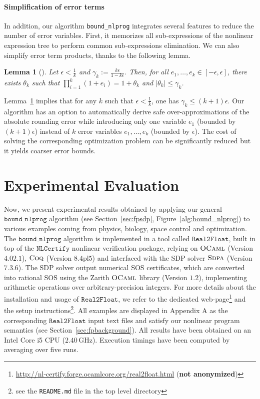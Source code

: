 \documentclass[preprint,fleqn,nocopyrightspace]{sigplanconf}
\newcommand{\code}[1]{\lstinline{#1}}
\newcommand{\boundnlprog}{\mathtt{bound\_nlprog}}
\newcommand{\realtofloat}{\mathtt{Real2Float}}
\newcommand{\coq}{\text{\sc Coq}}
\newcommand{\ocaml}{\text{\sc OCaml}}
\newcommand{\sdpa}{\text{\sc Sdpa}}
\newcommand{\nlcertify}{\mathtt{NLCertify}}
\newtheorem{lemma}[theorem]{Lemma}
\theoremstyle{plain}
\begin{document}
\paragraph{Simplification of error terms}
%
In addition, our algorithm \code{bound_nlprog} integrates several features to reduce the number of error variables. First, it memorizes all sub-expressions of the nonlinear expression tree to perform common sub-expressions elimination. 
We can also simplify error term products, thanks to the following lemma.
\begin{lemma}[]
\label{th:redproduct}
Let $\epsilon < \frac{1}{k}$ and $\gamma_k := \frac{k \epsilon}{1 - k \epsilon}$. Then, for all $e_1, \dots, e_k \in [-\epsilon, \epsilon]$, there exists $\theta_k$ such that ${\prod_{i=1}^k (1 + e_i) = 1 + \theta_k}$ and $\mid \theta_k \mid \leq \gamma_k$.
\end{lemma}
%
Lemma~\ref{th:redproduct} implies that for any $k$ such that $\epsilon < \frac{1}{k}$, one has $\gamma_k \leq (k + 1) \epsilon$. Our algorithm has an option to automatically derive safe over-approximations of the absolute rounding error while introducing only one variable $e_1$ (bounded by $(k + 1) \epsilon$) instead of $k$ error variables $e_1, \dots, e_k$ (bounded by $\epsilon$). The cost of solving the corresponding optimization problem can be significantly reduced but it yields coarser error bounds.
%
\vspace*{-0.2cm}
\section{Experimental Evaluation}
\label{sec:benchs}
%
Now, we present experimental results obtained by applying our general $\boundnlprog$ algorithm (see Section~\ref{sec:fpsdp}, Figure~\ref{alg:bound_nlprog}) to various examples coming from physics, biology, space control and optimization. 
The  $\boundnlprog$ algorithm is implemented in a tool called $\realtofloat$, built in top of the $\nlcertify$ nonlinear verification package, relying on $\ocaml$ (Version $4.02.1$), $\coq$ (Version $8.4\text{pl}5$) and interfaced with the SDP solver $\sdpa$ (Version $7.3.6$). The SDP solver output numerical SOS certificates, which are converted into rational SOS using the {\sc Zarith} $\ocaml$ library (Version $1.2$), implementing arithmetic operations over arbitrary-precision integers.
For more details about the installation and usage of $\realtofloat$, we refer to the dedicated web-page\footnote{\url{http://nl-certify.forge.ocamlcore.org/real2float.html} (\textbf{not anonymized})} and the setup instructions\footnote{see the \texttt{README.md} file in the top level directory}. 
All examples are displayed in Appendix A as the corresponding $\realtofloat$ input text files and satisfy our nonlinear program semantics (see Section~\ref{sec:fpbackground}). All results have been obtained on an Intel Core i5 CPU ($2.40\, $GHz). Execution timings have been computed by averaging over five runs.
%
\vspace*{-0.2cm}
\end{document}
